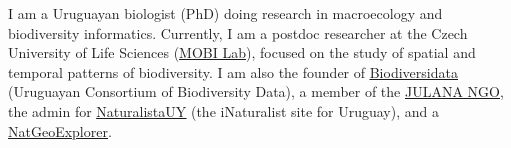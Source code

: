 \documentclass[9pt]{developercv} %
\begin{document}
\vspace{0.5cm}


%
%	



I am a Uruguayan biologist (PhD) doing research in macroecology and biodiversity informatics. Currently, I am a postdoc researcher at the Czech University of Life Sciences (\href{https://petrkeil.github.io/}{\underline{MOBI Lab}}), focused on the study of spatial and temporal patterns of biodiversity. I am also the founder of \href{https://biodiversidata.org/}{\underline{Biodiversidata}} (Uruguayan Consortium of Biodiversity Data), a member of the \href{https://julana.org/}{\underline{JULANA NGO}}, the admin for \href{https://www.naturalista.uy/}{\underline{NaturalistaUY}} (the iNaturalist site for Uruguay), and a \href{https://www.nationalgeographic.org/find-explorers/ED0031R000029s0gjQAA}{\underline{NatGeoExplorer}}.\\\\
\end{document}

